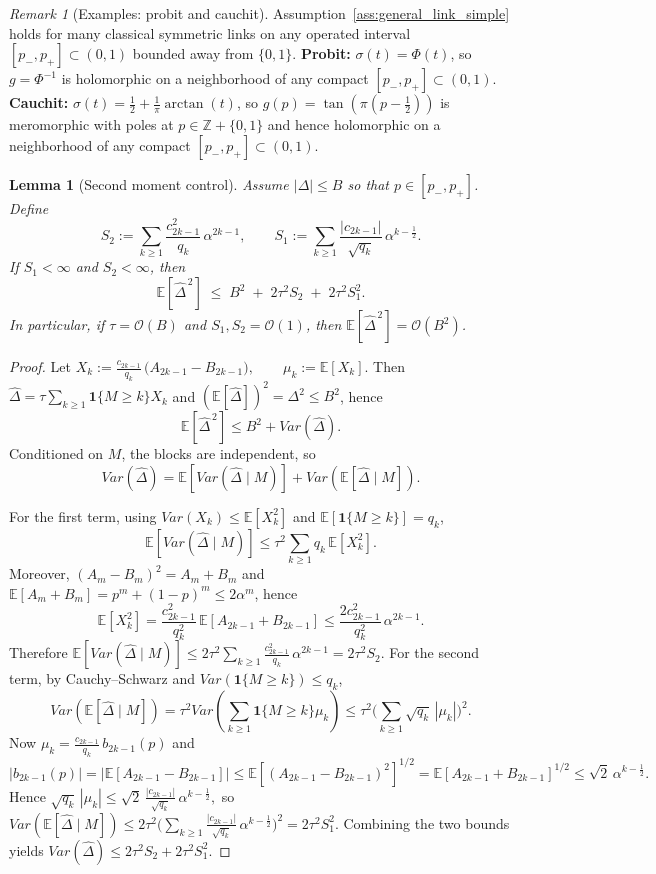 \documentclass[11pt]{article}
\theoremstyle{plain}
\newtheorem{lemma}[theorem]{Lemma}
\theoremstyle{remark}
\newtheorem{remark}[theorem]{Remark}
\newcommand{\E}{\mathbb{E}}
\newcommand{\Var}{Var}
\newcommand{\1}{\mathbf{1}}
\begin{document}
\begin{remark}[Examples: probit and cauchit]\label{rem:general_link_examples_simple}
Assumption~\ref{ass:general_link_simple} holds for many classical symmetric links on any operated interval
$[p_-,p_+]\subset(0,1)$ bounded away from $\{0,1\}$.
\textbf{Probit:} $\sigma(t)=\Phi(t)$, so $g=\Phi^{-1}$ is holomorphic on a neighborhood of any compact
$[p_-,p_+]\subset(0,1)$.
\textbf{Cauchit:} $\sigma(t)=\tfrac12+\tfrac{1}{\pi}\arctan(t)$, so $g(p)=\tan(\pi(p-\tfrac12))$ is meromorphic with poles
at $p\in\mathbb{Z}+\{0,1\}$ and hence holomorphic on a neighborhood of any compact $[p_-,p_+]\subset(0,1)$.
\end{remark}


\begin{propbox}
\begin{lemma}[Second moment control]\label{lem:moment_simple}
Assume $|\Delta|\le B$ so that $p\in[p_-,p_+]$.
Define
$$
S_2:=\sum_{k\ge1}\frac{c_{2k-1}^2}{q_k}\,\alpha^{2k-1},
\qquad
S_1:=\sum_{k\ge1}\frac{|c_{2k-1}|}{\sqrt{q_k}}\,\alpha^{k-\frac12}.
$$
If $S_1<\infty$ and $S_2<\infty$, then
$$
\E[\widehat\Delta^{\,2}]
\;\le\;
B^2 \;+\; 2\tau^2 S_2 \;+\; 2\tau^2 S_1^2.
$$
In particular, if $\tau=\mathcal O(B)$ and $S_1,S_2=\mathcal O(1)$, then $\E[\widehat\Delta^{\,2}]=\mathcal O(B^2)$.
\end{lemma}
\end{propbox}

\begin{proof}
Let
$
X_k:=\frac{c_{2k-1}}{q_k}\,\big(A_{2k-1}-B_{2k-1}\big),
\qquad
\mu_k:=\E[X_k].
$
Then $\widehat\Delta=\tau\sum_{k\ge1}\1\{M\ge k\}X_k$ and $(\E[\widehat\Delta])^2=\Delta^2\le B^2$, hence
$$
\E[\widehat\Delta^{\,2}]\le B^2+\Var(\widehat\Delta).
$$
Conditioned on $M$, the blocks are independent, so
$$
\Var(\widehat\Delta)
=
\E\!\left[\Var(\widehat\Delta\mid M)\right]
+
\Var\!\left(\E[\widehat\Delta\mid M]\right).
$$

For the first term, using $\Var(X_k)\le \E[X_k^2]$ and $\E[\1\{M\ge k\}]=q_k$,
\[
\E\!\left[\Var(\widehat\Delta\mid M)\right]
\le
\tau^2\sum_{k\ge1} q_k\,\E[X_k^2].
\]
Moreover, $(A_{m}-B_{m})^2=A_m+B_m$ and
$\E[A_m+B_m]=p^m+(1-p)^m\le 2\alpha^m$, hence
$$
\E[X_k^2]
=
\frac{c_{2k-1}^2}{q_k^2}\,\E[A_{2k-1}+B_{2k-1}]
\le
\frac{2c_{2k-1}^2}{q_k^2}\,\alpha^{2k-1}.
$$
Therefore
$
\E\!\left[\Var(\widehat\Delta\mid M)\right]
\le
2\tau^2\sum_{k\ge1}\frac{c_{2k-1}^2}{q_k}\,\alpha^{2k-1}
=
2\tau^2 S_2.
$ For the second term, by Cauchy--Schwarz and $\Var(\1\{M\ge k\})\le q_k$,
\[
\Var\!\left(\E[\widehat\Delta\mid M]\right)
=
\tau^2\Var\!\left(\sum_{k\ge1}\1\{M\ge k\}\mu_k\right)
\le
\tau^2\Big(\sum_{k\ge1}\sqrt{q_k}\,|\mu_k|\Big)^2.
\]
Now $\mu_k=\frac{c_{2k-1}}{q_k}\,b_{2k-1}(p)$ and
\[
|b_{2k-1}(p)|
=|\E[A_{2k-1}-B_{2k-1}]|
\le
\E[(A_{2k-1}-B_{2k-1})^2]^{1/2}
=
\E[A_{2k-1}+B_{2k-1}]^{1/2}
\le
\sqrt{2}\,\alpha^{k-\frac12}.
\]
Hence
$
\sqrt{q_k}\,|\mu_k|
\le
\sqrt{2}\,\frac{|c_{2k-1}|}{\sqrt{q_k}}\,\alpha^{k-\frac12},
$
so
$
\Var\!\left(\E[\widehat\Delta\mid M]\right)
\le
2\tau^2\Big(\sum_{k\ge1}\frac{|c_{2k-1}|}{\sqrt{q_k}}\,\alpha^{k-\frac12}\Big)^2
=
2\tau^2 S_1^2.
$
Combining the two bounds yields
$
\Var(\widehat\Delta)\le 2\tau^2 S_2 + 2\tau^2 S_1^2.
$
\end{proof}
\end{document}
